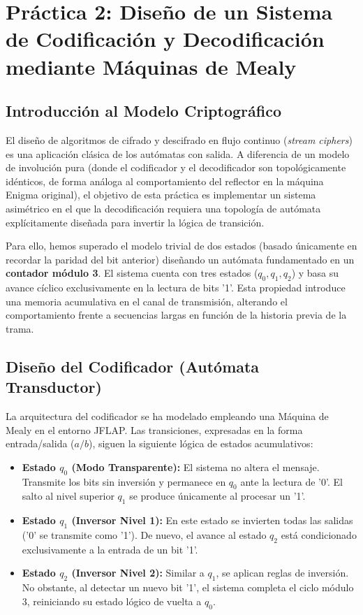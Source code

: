 \documentclass[12pt,a4paper]{article}
\begin{document}
\newpage

\section{Práctica 2: Diseño de un Sistema de Codificación y Decodificación mediante Máquinas de Mealy}

\subsection{Introducción al Modelo Criptográfico}
El diseño de algoritmos de cifrado y descifrado en flujo continuo (\textit{stream ciphers}) es una aplicación clásica de los autómatas con salida. A diferencia de un modelo de involución pura (donde el codificador y el decodificador son topológicamente idénticos, de forma análoga al comportamiento del reflector en la máquina Enigma original), el objetivo de esta práctica es implementar un sistema asimétrico en el que la decodificación requiera una topología de autómata explícitamente diseñada para invertir la lógica de transición.

Para ello, hemos superado el modelo trivial de dos estados (basado únicamente en recordar la paridad del bit anterior) diseñando un autómata fundamentado en un \textbf{contador módulo 3}. El sistema cuenta con tres estados ($q_0, q_1, q_2$) y basa su avance cíclico exclusivamente en la lectura de bits '1'. Esta propiedad introduce una memoria acumulativa en el canal de transmisión, alterando el comportamiento frente a secuencias largas en función de la historia previa de la trama.

\subsection{Diseño del Codificador (Autómata Transductor)}
La arquitectura del codificador se ha modelado empleando una Máquina de Mealy en el entorno JFLAP. Las transiciones, expresadas en la forma entrada/salida ($a/b$), siguen la siguiente lógica de estados acumulativos:

\begin{itemize}
    \item \textbf{Estado $q_0$ (Modo Transparente):} El sistema no altera el mensaje. Transmite los bits sin inversión y permanece en $q_0$ ante la lectura de '0'. El salto al nivel superior $q_1$ se produce únicamente al procesar un '1'.
    \item \textbf{Estado $q_1$ (Inversor Nivel 1):} En este estado se invierten todas las salidas ('0' se transmite como '1'). De nuevo, el avance al estado $q_2$ está condicionado exclusivamente a la entrada de un bit '1'.
    \item \textbf{Estado $q_2$ (Inversor Nivel 2):} Similar a $q_1$, se aplican reglas de inversión. No obstante, al detectar un nuevo bit '1', el sistema completa el ciclo módulo 3, reiniciando su estado lógico de vuelta a $q_0$.
\end{itemize}
\end{document}
